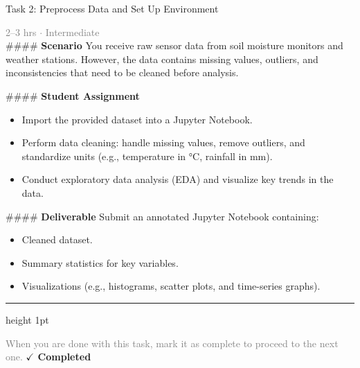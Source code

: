 \documentclass[10pt,a4paper]{article}
\begin{document}
\begin{taskbox}{Task 2: Preprocess Data and Set Up Environment}

    {\small \textcolor{gray}{2--3 hrs $\cdot$ Intermediate}}\\[12pt]

    \#\#\#\# \textbf{Scenario}  
You receive raw sensor data from soil moisture monitors and weather stations. However, the data contains missing values, outliers, and inconsistencies that need to be cleaned before analysis.

\#\#\#\# \textbf{Student Assignment}  
\begin{itemize}
    \item Import the provided dataset into a Jupyter Notebook.
    \item Perform data cleaning: handle missing values, remove outliers, and standardize units (e.g., temperature in °C, rainfall in mm).
    \item Conduct exploratory data analysis (EDA) and visualize key trends in the data.
\end{itemize}

\#\#\#\# \textbf{Deliverable}  
Submit an annotated Jupyter Notebook containing:
\begin{itemize}
    \item Cleaned dataset.
    \item Summary statistics for key variables.
    \item Visualizations (e.g., histograms, scatter plots, and time-series graphs).\par
\end{itemize}

    \vspace{16pt}

    \textcolor{cardBorder}{\hrule height 1pt}\vspace{8pt}

    \small \textcolor{gray}{When you are done with this task, mark it as complete to proceed to the next one.} \hfill \textbf{\textcolor{brandDark}{$\checkmark$ Completed}}

\end{taskbox}
\end{document}
